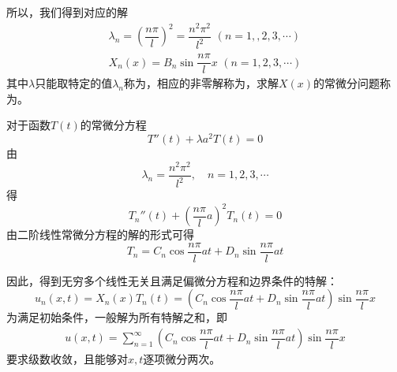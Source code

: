 所以，我们得到对应的解
\begin{align}
	\lambda_n = \left(\dfrac{n \pi}{l}\right)^2 = \dfrac{n^2 \pi^2}{l^2}\,\,(n =1, ,2,3, \cdots)\\[0.5em]
	X_n(x) = B_n \sin \dfrac{n \pi}{l}x \,\, (n = 1,2,3, \cdots )
\end{align}
其中$\lambda$只能取特定的值$\lambda_n$称为，相应的非零解称为，求解$X(x)$的常微分问题称为。


对于函数$T(t)$的常微分方程
\begin{equation*}
	T''(t) + \lambda a^2 T(t) = 0
\end{equation*}
由
\begin{equation*}
	\lambda_n = \dfrac{n^2 \pi^2}{l^2}, \quad n = 1,2,3,\cdots
\end{equation*}
得
\begin{equation*}
	T_n''(t) + \left(\dfrac{n\pi}{l}a\right)^2 T_n(t) = 0
\end{equation*}
由二阶线性常微分方程的解的形式可得
\begin{equation}
	T_n = C_n \cos \dfrac{n\pi}{l}at + D_n \sin \dfrac{n \pi }{l} a t
\end{equation}

因此，得到无穷多个线性无关且满足偏微分方程和边界条件的特解：
\begin{equation}
	u_n(x, t) = X_n(x)T_n(t)=\left(C_n \cos \dfrac{n \pi}{l}at + D_n \sin \dfrac{n \pi}{l} at \right)\sin \dfrac{n \pi}{l}x
\end{equation}
为满足初始条件，一般解为所有特解之和，即
\begin{align}
	u(x, t) = \sum_{n = 1}^{\infty} \left(C_n \cos \dfrac{n \pi}{l}at + D_n \sin \dfrac{n \pi}{l} at \right)\sin \dfrac{n \pi}{l}x
\end{align}
要求级数收敛，且能够对$x,t$逐项微分两次。


